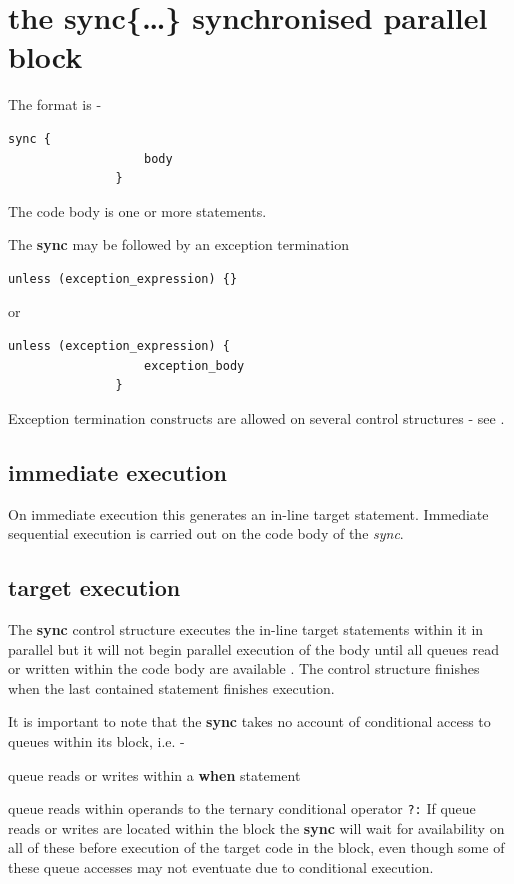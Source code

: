     \section{the {\bf sync\{\dots\}} synchronised parallel block}\label{sec:sync}

        The format is -
        \begin{lstlisting}[gobble=8, language=threepl]
               sync {
                   body
               }
        \end{lstlisting}
        The code body is one or more statements.
        
        The {\bf sync} may be followed by an exception termination
        \begin{lstlisting}[gobble=8, language=threepl]
               unless (exception_expression) {}
        \end{lstlisting}
        or
        \begin{lstlisting}[gobble=8, language=threepl]
               unless (exception_expression) {
                   exception_body
               }
        \end{lstlisting}
        
        Exception termination constructs are allowed on several control structures
        - see .
        
        \subsection{immediate execution}
        
            On immediate execution this generates an in-line target statement.
            Immediate sequential execution is carried out on the code body
            of the {\em sync}.
        
        \subsection{target execution}

            The {\bf sync} control structure executes the in-line target statements
            within it in parallel but it will not begin parallel execution of
            the body until all queues read or written within the code body are
            available . The control structure finishes
            when the last contained statement finishes execution.
            
            It is important to note that the {\bf sync} takes no account
            of conditional access to queues within its block, i.e. -
            \blist
            \item   queue reads or writes within a {\bf when} statement
            \item   queue reads within operands to the ternary conditional
                    operator \verb'?:'
            \blend
            If queue reads or writes are located within the block the {\bf sync}
            will wait for availability on all of these before execution of the
            target code in the block, even though some of these queue accesses
            may not eventuate due to conditional execution.
            
